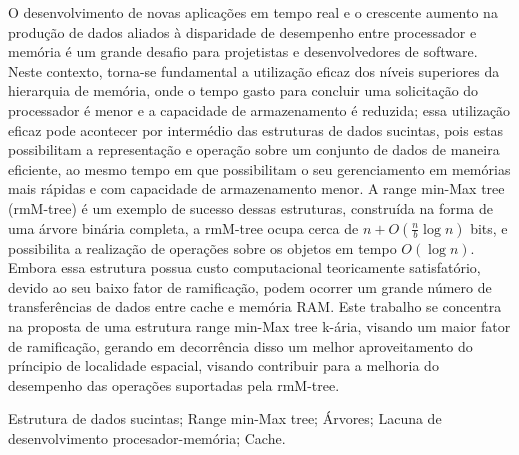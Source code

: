 O desenvolvimento de novas aplicações em tempo real e o crescente aumento na produção de dados aliados à disparidade de desempenho entre processador 
e memória é um grande desafio para projetistas e desenvolvedores de software. Neste contexto, torna-se fundamental a utilização eficaz dos níveis superiores da hierarquia de memória, onde o tempo gasto para concluir uma  solicitação do processador é menor e a capacidade de armazenamento é  reduzida; essa utilização eficaz pode acontecer por intermédio das estruturas 
de dados sucintas, pois estas possibilitam a representação e operação sobre um conjunto de dados de maneira eficiente, ao mesmo tempo em que possibilitam  o seu gerenciamento em memórias mais rápidas e com capacidade de armazenamento menor. A range min-Max tree (rmM-tree) é um exemplo de sucesso dessas estruturas, construída na forma de uma árvore binária completa, a 
rmM-tree ocupa cerca de $n + O(\frac{n}{b} \log n)$ bits, e possibilita a realização de operações sobre os objetos em  tempo $O(\log n)$. Embora essa estrutura possua custo computacional teoricamente  satisfatório, devido ao seu baixo fator de ramificação, podem ocorrer um grande número de transferências de dados entre cache e memória RAM.  Este trabalho se concentra na proposta de uma estrutura range min-Max tree k-ária, visando um maior fator de ramificação, gerando em decorrência disso um melhor aproveitamento do príncipio de localidade espacial, visando contribuir para a melhoria do desempenho das operações suportadas pela rmM-tree. 


\begin{keywords}
Estrutura de dados sucintas; Range min-Max tree; Árvores; Lacuna de desenvolvimento procesador-memória; Cache.
\end{keywords}